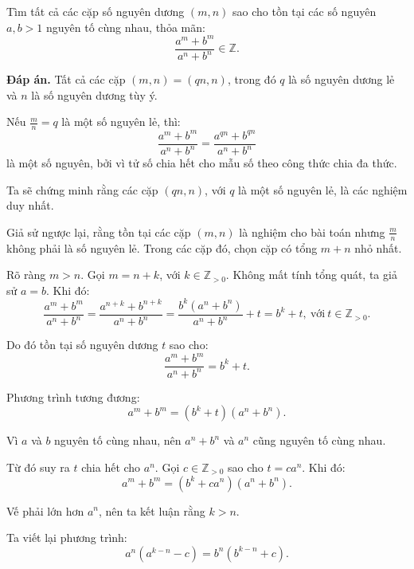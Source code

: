 \ifshowproblemandsoln
\ifshowproblem\begin{problem}\label{problem:MEMO-2015-I-P4}\fi
\ifshowsoln\begin{problem}\fi
    Tìm tất cả các cặp số nguyên dương \( (m, n) \) sao cho tồn tại các số nguyên \( a, b > 1 \) nguyên tố cùng nhau, thỏa mãn:
    \[
        \frac{a^m + b^m}{a^n + b^n} \in \mathbb{Z}.
    \]
\end{problem}
\fi

\ifshowsoln
\begin{soln}\footnotemark
    \textbf{Đáp án.} Tất cả các cặp \( (m, n) = (qn, n) \), trong đó \( q \) là số nguyên dương lẻ và \( n \) là số nguyên dương tùy ý.

    Nếu \( \frac{m}{n} = q \) là một số nguyên lẻ, thì:
    \[
        \frac{a^m + b^m}{a^n + b^n} = \frac{a^{qn} + b^{qn}}{a^n + b^n}
    \]
    là một số nguyên, bởi vì tử số chia hết cho mẫu số theo công thức chia đa thức.

    Ta sẽ chứng minh rằng các cặp \( (qn, n) \), với \( q \) là một số nguyên lẻ, là các nghiệm duy nhất.

    Giả sử ngược lại, rằng tồn tại các cặp \( (m, n) \) là nghiệm cho bài toán nhưng \( \frac{m}{n} \) không phải là số nguyên lẻ. Trong các cặp đó, chọn cặp có tổng \( m + n \) nhỏ nhất.

    Rõ ràng \( m > n \). Gọi \( m = n + k \), với \( k \in \mathbb{Z}_{>0} \). Không mất tính tổng quát, ta giả sử \( a = b \). Khi đó:
    \[
        \frac{a^m + b^m}{a^n + b^n} = \frac{a^{n+k} + b^{n+k}}{a^n + b^n} = \frac{b^k(a^n + b^n)}{a^n + b^n} + t = b^k + t,\ \text{với}\ t \in \mathbb{Z}_{>0}.
    \]

    Do đó tồn tại số nguyên dương \( t \) sao cho:
    \[
        \frac{a^m + b^m}{a^n + b^n} = b^k + t.
    \]

    Phương trình tương đương:
    \[
        a^m + b^m = (b^k + t)(a^n + b^n).
    \]

    Vì \( a \) và \( b \) nguyên tố cùng nhau, nên \( a^n + b^n \) và \( a^n \) cũng nguyên tố cùng nhau.
    
    Từ đó suy ra \( t \) chia hết cho \( a^n \). Gọi \( c \in \mathbb{Z}_{>0} \) sao cho \( t = c a^n \). Khi đó:
    \[
        a^m + b^m = (b^k + c a^n)(a^n + b^n).
    \]

    Vế phải lớn hơn \( a^n \), nên ta kết luận rằng \( k > n \).

    Ta viết lại phương trình:
    \[
        a^n(a^{k - n} - c) = b^n(b^{k - n} + c).
    \]


\end{soln}
\end{problem}
